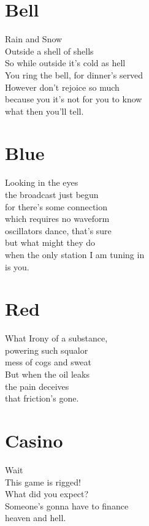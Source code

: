\documentclass[a4paper,twoside, openany]{book}
\newenvironment{Verse}
  {\center\varwidth{\linewidth}\fontsize{18}{21.6}\selectfont}
  {\endvarwidth\endcenter}
\begin{document}
\chapter{Bell}
\begin{Verse}
    Rain and Snow\\
    Outside a shell of shells\\
    So while outside it’s cold as hell\\
    You ring the bell, for dinner’s served\\
    However don’t rejoice so much\\
    because you it’s not for you to know\\
    what then you’ll tell.
\end{Verse}

\chapter{Blue}
\begin{Verse}
    Looking in the eyes\\
    the broadcast just begun\\
    for there's some connection\\
    which requires no waveform\\
    oscillators dance, that's sure\\
    but what might they do\\
    when the only station I am tuning in\\
    is you.
\end{Verse}

\chapter{Red}
\begin{Verse}
    What Irony of a substance,\\
    powering such squalor\\
    mess of cogs and sweat\\
    But when the oil leaks\\
    the pain deceives\\
    that friction's gone.\\
\end{Verse}

\chapter{Casino}
\begin{Verse}
    Wait\\
    This game is rigged!\\
    What did you expect?\\
    Someone's gonna have to finance\\
    heaven and hell.
\end{Verse}
\end{document}
